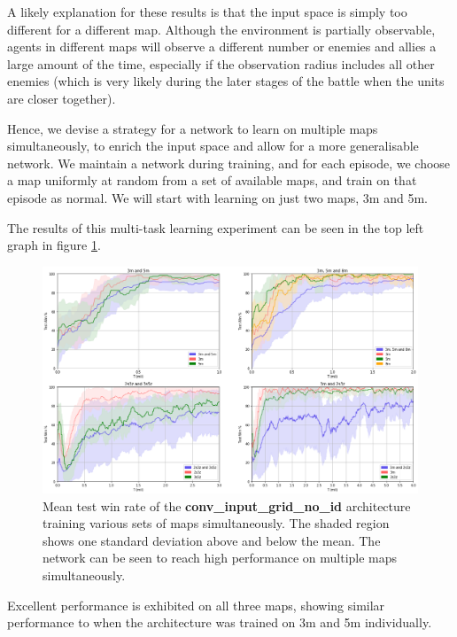 A likely explanation for these results is that the input space is simply too different for a different map. Although the environment is partially observable, agents in different maps will observe a different number or enemies and allies a large amount of the time, especially if the observation radius includes all other enemies (which is very likely during the later stages of the battle when the units are closer together). 

Hence, we devise a strategy for a network to learn on multiple maps simultaneously, to enrich the input space and allow for a more generalisable network. We maintain a network during training, and for each episode, we choose a map uniformly at random from a set of available maps, and train on that episode as normal. We will start with learning on just two maps, 3m and 5m.

The results of this multi-task learning experiment can be seen in the top left graph in figure \ref{fig:reptileall}. 




\begin{figure}[h]
    \centering
    \hbox{\hspace{-5em}\includegraphics[width=1.2\textwidth]{images/graphs/all.png}}
    \caption{Mean test win rate of the \textbf{conv\_input\_grid\_no\_id} architecture training various sets of maps simultaneously. The shaded region shows one standard deviation above and below the mean. The network can be seen to reach high performance on multiple maps simultaneously.}
    \label{fig:reptileall}
\end{figure}


Excellent performance is exhibited on all three maps, showing similar performance to when the architecture was trained on 3m and 5m individually.  

